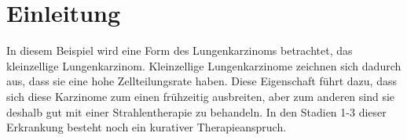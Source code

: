 \section{Einleitung}
\label{sec:Theorie}

In diesem Beispiel wird eine Form des Lungenkarzinoms betrachtet, das kleinzellige Lungenkarzinom.
Kleinzellige Lungenkarzinome zeichnen sich dadurch aus, dass sie eine hohe Zellteilungsrate haben.
Diese Eigenschaft führt dazu, dass sich diese Karzinome zum einen frühzeitig ausbreiten, aber zum anderen sind
sie deshalb gut mit einer Strahlentherapie zu behandeln. In den Stadien 1-3 dieser Erkrankung besteht noch
ein kurativer Therapieanspruch. \cite{SCLC}
